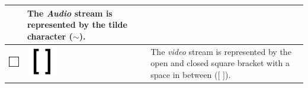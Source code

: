 \begin{longtable}{|m{}|m{}|m{}|}
    & 
    The \textit{Audio} stream is represented by the tilde character ($\sim$).
    \\\hline
    \centering
    \includegraphics[width=0.75\linewidth]{chapters/4-MDC_model_application/image/bvl-video-o.png}
    &
    \centering
    \includegraphics[width=0.75\linewidth]{chapters/4-MDC_model_application/image/bvl-video.png}
    & 
    The \textit{video} stream is represented by the open and closed square bracket with a space in between ([ ]). 

\end{longtable}
